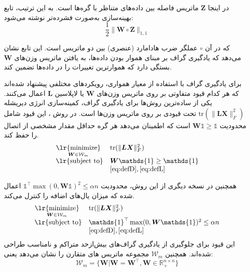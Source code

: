 \documentclass[10pt,twocolumn,a4paper]{article}
\newcommand\minimize[1]{\mathop{\text{\lr{minimize}}}\limits_{#1}\ }
\begin{document}
     در اینجا \( \bm{Z} \) ماتریس فاصله بین داده‌های متناظر با گره‌ها است. به این ترتیب، تابع بهینه‌سازی به‌صورت فشرده‌تر نوشته می‌شود:
\begin{equation}
	     \frac{1}{2} \| \bm{W} \circ \bm{Z} \|_{1,1}
\end{equation}
     
     که در آن \( \circ \) عملگر ضرب هادامارد (عنصری) بین دو ماتریس است. این تابع نشان می‌دهد که یادگیری گراف بر مبنای هموار بودن داده‌ها، به یافتن ماتریس وزن‌های \( \bm{W} \) بستگی دارد که هموارترین تغییرات را در داده‌ها تضمین کند.
     
     برای یادگیری گراف با استفاده از معیار همواری، رویکردهای مختلفی پیشنهاد شده‌اند که هر کدام قیود متفاوتی بر روی ماتریس وزن‌های \( \bm{W} \) یا لاپلاسین \( \bm{L} \) اعمال می‌کنند. یکی از ساده‌ترین روش‌ها برای یادگیری گراف، کمینه‌سازی انرژی دیریشله \( \text{tr}(\|\bm{L} \bm{X}\|^2_F) \) تحت قیودی بر روی ماتریس وزن‌ها است.
     در روش \cite{Daitch2009}، این قیود شامل محدودیت \( \bm{W} \mathds{1} \geq \mathds{1} \) است که اطمینان می‌دهد هر گره حداقل مقدار مشخصی از اتصال را حفظ کند. 
     \begin{equation}
     		\begin{array}{cl}
     			\minimize{\bm{W}\in\mathcal{W}_m} & \text{tr}(\|\bm{L} \bm{X}\|^2_F) \\
     			\text{\lr{subject to}} & \bm{W} \mathds{1} \ge \mathds{1} \\
     			& \eqref{eq:defD}, \eqref{eq:defL}
     		\end{array}
     \end{equation}
     
     همچنین در نسخه دیگری از این روش، محدودیت \( \mathds{1}^\top \max(0, \bm{W} \mathds{1})^2 \leq \alpha n \) اعمال شده که میزان یال‌های اضافه را کنترل می‌کند. 
      \begin{equation}
     	\begin{array}{cl}
     		\minimize{\bm{W}\in\mathcal{W}_m} & \text{tr}(\|\bm{L} \bm{X}\|^2_F) \\
     		\text{\lr{subject to}} & \mathds{1}^\top \max(0, \bm{W} \mathds{1})^2 \leq \alpha n  \\
     		& \eqref{eq:defD}, \eqref{eq:defL}
     	\end{array}
     \end{equation}
     این قیود برای جلوگیری از یادگیری گراف‌های بیش‌ازحد متراکم و نامناسب طراحی شده‌اند. همچنین 
     $\mathcal{W}_m$
     مجموعه ماتریس های متقارن را نشان می‌دهد یعنی:
     \begin{equation}
     	  \mathcal{W}_m = \big\{\bm{W} | \bm{W} = \bm{W}^\top, \bm{W} \in \mathds{R}_+^{n\times n}\big\}
     \end{equation}
     
\end{document}
